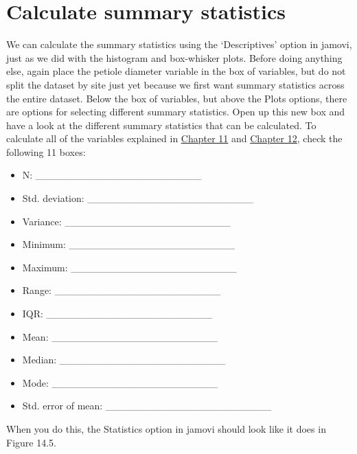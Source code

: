 \documentclass[
]{scrbook}
\providecommand{\tightlist}{%
  \setlength{\itemsep}{0pt}\setlength{\parskip}{0pt}}
\begin{document}
\hypertarget{calculate-summary-statistics}{%
\section{Calculate summary statistics}\label{calculate-summary-statistics}}

We can calculate the summary statistics using the `Descriptives' option in jamovi, just as we did with the histogram and box-whisker plots.
Before doing anything else, again place the petiole diameter variable in the box of variables, but do not split the dataset by site just yet because we first want summary statistics across the entire dataset.
Below the box of variables, but above the Plots options, there are options for selecting different summary statistics.
Open up this new box and have a look at the different summary statistics that can be calculated.
To calculate all of the variables explained in \protect\hyperlink{Chapter_11}{Chapter 11} and \protect\hyperlink{Chapter_12}{Chapter 12}, check the following 11 boxes:

\begin{itemize}
\tightlist
\item
  N: \_\_\_\_\_\_\_\_\_\_\_\_\_\_\_\_\_\_\_\_\_\_\_
\item
  Std. deviation: \_\_\_\_\_\_\_\_\_\_\_\_\_\_\_\_\_\_\_\_\_\_\_
\item
  Variance: \_\_\_\_\_\_\_\_\_\_\_\_\_\_\_\_\_\_\_\_\_\_\_
\item
  Minimum: \_\_\_\_\_\_\_\_\_\_\_\_\_\_\_\_\_\_\_\_\_\_\_
\item
  Maximum: \_\_\_\_\_\_\_\_\_\_\_\_\_\_\_\_\_\_\_\_\_\_\_
\item
  Range: \_\_\_\_\_\_\_\_\_\_\_\_\_\_\_\_\_\_\_\_\_\_\_
\item
  IQR: \_\_\_\_\_\_\_\_\_\_\_\_\_\_\_\_\_\_\_\_\_\_\_
\item
  Mean: \_\_\_\_\_\_\_\_\_\_\_\_\_\_\_\_\_\_\_\_\_\_\_
\item
  Median: \_\_\_\_\_\_\_\_\_\_\_\_\_\_\_\_\_\_\_\_\_\_\_
\item
  Mode: \_\_\_\_\_\_\_\_\_\_\_\_\_\_\_\_\_\_\_\_\_\_\_
\item
  Std. error of mean: \_\_\_\_\_\_\_\_\_\_\_\_\_\_\_\_\_\_\_\_\_\_\_
\end{itemize}

When you do this, the Statistics option in jamovi should look like it does in Figure 14.5.
\end{document}
